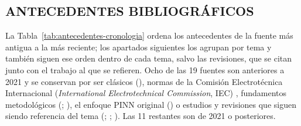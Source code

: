 \documentclass[11pt,a4paper,oneside]{report}
\begin{document}
\subsection{ANTECEDENTES BIBLIOGRÁFICOS}
\label{sec:antecedentes}

La Tabla~\ref{tab:antecedentes-cronologia} ordena los antecedentes de la fuente más antigua a la más reciente; los apartados siguientes los agrupan por tema y también siguen ese orden dentro de cada tema, salvo las revisiones, que se citan junto con el trabajo al que se refieren. Ocho de las 19 fuentes son anteriores a 2021 y se conservan por ser clásicos (\textcite{neher1957}), normas de la Comisión Electrotécnica Internacional (\textit{International Electrotechnical Commission}, IEC) \parencite{iec60853}, fundamentos metodológicos (\textcite{peffers2007}; \textcite{gregor2013}), el enfoque PINN original (\textcite{raissi2019}) o estudios y revisiones que siguen siendo referencia del tema (\textcite{aras2005}; \textcite{oclon2015}; \textcite{enescu2020}). Las 11 restantes son de 2021 o posteriores.
\end{document}
